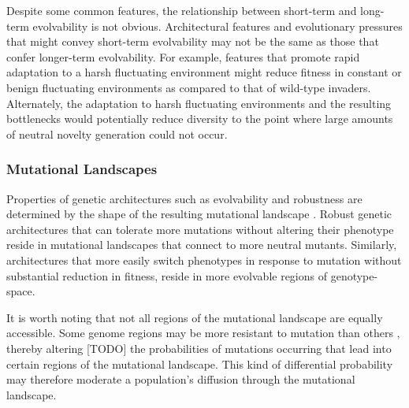 \documentclass[PhD]{msu-thesis}
\begin{document}
Despite some common features, the relationship between short-term and long-term evolvability is not obvious. Architectural features and evolutionary pressures that might convey short-term evolvability may not be the same as those that confer longer-term evolvability\cite{pigliucci_is_2008}. For example, features that promote rapid adaptation to a harsh fluctuating environment might reduce fitness in constant or benign fluctuating environments as compared to that of wild-type invaders. Alternately, the adaptation to harsh fluctuating environments and the resulting bottlenecks would potentially reduce diversity to the point where large amounts of neutral novelty generation could not occur.

\subsubsection{Mutational Landscapes}
Properties of genetic architectures such as evolvability and robustness are determined by the shape of the resulting mutational landscape \cite{andreas_wagner_robustness_2008}. Robust genetic architectures that can tolerate more mutations without altering their phenotype reside in mutational landscapes that connect to more neutral mutants. Similarly, architectures that more easily switch phenotypes in response to mutation without substantial reduction in fitness, reside in more evolvable regions of genotype-space.

It is worth noting that not all regions of the mutational landscape are equally accessible. Some genome regions may be more resistant to mutation than others \cite{lee_rate_2012}, thereby altering [\@RCK TODO] the probabilities of mutations occurring that lead into certain regions of the mutational landscape. This kind of differential probability may therefore moderate a population's diffusion through the mutational landscape.
\end{document}
